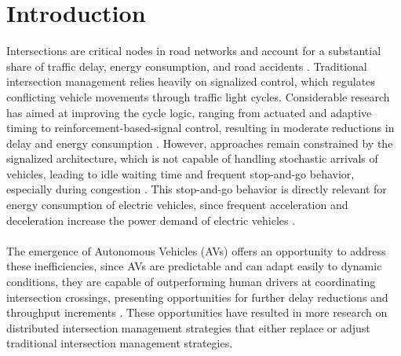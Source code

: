 
\section{Introduction}
Intersections are critical nodes in road networks and account for a substantial share of traffic delay, energy consumption, and road accidents \parencite{farina2026v2n, el2026distributed,bui2017real}. Traditional intersection management relies heavily on signalized control, which regulates conflicting vehicle movements through traffic light cycles. Considerable research has aimed at improving the cycle logic, ranging from actuated and adaptive timing to reinforcement-based-signal control, resulting in moderate reductions in delay and energy consumption \parencite{el2026distributed, 10433940}. However, approaches remain constrained by the signalized architecture, which is not capable of handling stochastic arrivals of vehicles, leading to idle waiting time and frequent stop-and-go behavior, especially during congestion \parencite{el2026distributed}. This stop-and-go behavior is directly relevant for energy consumption of electric vehicles, since frequent acceleration and deceleration increase the power demand of electric vehicles \parencite{kamal2014vehicle,galvin2017energy}.
\\\\
The emergence of Autonomous Vehicles (AVs) offers an opportunity to address these inefficiencies, since AVs are predictable and can adapt easily to dynamic conditions, they are capable of outperforming human drivers at coordinating intersection crossings, presenting opportunities for further delay reductions and throughput increments \parencite{soltani2025communication}. These opportunities have resulted in more research on distributed intersection management strategies that either replace or adjust traditional intersection management strategies. 
\\\\
